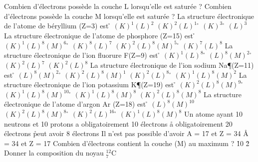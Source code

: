 \q
Combien d'électrons possède la couche L lorsqu'elle est saturée  ?
\q
Combien d'électrons possède la couche M lorsqu'elle est saturée   ?
\q
La structure électronique de l'atome de béryllium (Z=3) est
\r
$(K)^1(L)^2$
\rv
$(K)^2(L)^1 $
\r
$(K)^3$
\r
$(L)^3$
\q
La structure électronique de l'atome de phosphore (Z=15) est
\r
$(K)^1(L)^8(M)^6$
\r
$(K)^8(L)^7    $
\rv
$(K)^2(L)^8(M)^5$
\r
$(K)^7(L)^8    $
\q
La structure électronique de l'ion fluorure F\M(Z=9) est
\r
$(K)^1(L)^8     $
\r
$(L)^8(M)^2      $
\r
$(K)^2(L)^7      $
\rv
$(K)^2(L)^8      $
\q
La structure électronique de l'ion sodium Na\P (Z=11) est
\r
$(L)^8(M)^2     $
\r
$(K)^2(L)^8(M)^1 $
\rv
$(K)^2(L)^8     $
\r
$(K)^1(L)^8(M)^2 $
\q
La structure électronique de l'ion potassium K\P (Z=19) est
\r
$(K)^2(L)^8(M)^9$
\r
$(K)^1(L)^8(M)^{10}$
\r
$(K)^1(L)^8(M)^8 $
\rv
$(K)^2(L)^8(M)^8 $
\q
La structure électronique de l'atome d'argon Ar (Z=18) est
\r
$(L)^8(M)^{10}  $
\rv
$(K)^2(L)^8(M)^8$
\r
$(K)^2(L)^{16}$
\r
$(K)^1(L)^8(M)^8$
\q
Un atome ayant 10 neutrons et 10 protons
\rv
a obligatoirement 10 électrons
\r
a obligatoirement 20 électrons
\r
peut avoir 8 électrons
\q
Il n'est pas possible d'avoir
\rv
A = 17 et Z = 34
\r
A = 34 et Z = 17
\q
Combien d'électrons contient la couche (M) au maximum ?
\r
10
\r
2
\q
Donner la composition du noyau $^{12}_{7}$C